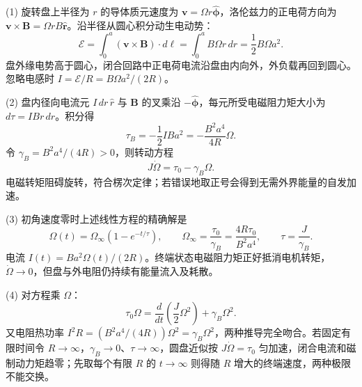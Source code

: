 (1) 旋转盘上半径为 \(r\) 的导体质元速度为 \(\boldsymbol v=\Omega r\hat{\boldsymbol\phi}\)，洛伦兹力的正电荷方向为 \(\boldsymbol v\times\boldsymbol B=\Omega rB\hat{\boldsymbol r}\)。沿半径从圆心积分动生电动势：
\[
\mathcal E=\int_0^a(\boldsymbol v\times\boldsymbol B)\cdot d\boldsymbol\ell
=\int_0^a B\Omega r\,dr=\frac12B\Omega a^2.
\]
盘外缘电势高于圆心，闭合回路中正电荷电流沿盘由内向外，外负载再回到圆心。忽略电感时 \(I=\mathcal E/R=B\Omega a^2/(2R)\)。

(2) 盘内径向电流元 \(I\,dr\,\hat r\) 与 \(\boldsymbol B\) 的叉乘沿 \(-\hat{\boldsymbol\phi}\)，每元所受电磁阻力矩大小为 \(d\tau=IBr\,dr\)。积分得
\[
\tau_B=-\frac12IBa^2=-\frac{B^2a^4}{4R}\Omega .
\]
令 \(\gamma_B=B^2a^4/(4R)>0\)，则转动方程
\[
J\dot\Omega=\tau_0-\gamma_B\Omega .
\]
电磁转矩阻碍旋转，符合楞次定律；若错误地取正号会得到无需外界能量的自发加速。

(3) 初角速度零时上述线性方程的精确解是
\[
\Omega(t)=\Omega_\infty(1-e^{-t/\tau}),\qquad
\Omega_\infty=\frac{\tau_0}{\gamma_B}=\frac{4R\tau_0}{B^2a^4},
\qquad\tau=\frac J{\gamma_B}.
\]
电流 \(I(t)=Ba^2\Omega(t)/(2R)\)。终端状态电磁阻力矩正好抵消电机转矩，\(\dot\Omega\to0\)，但盘与外电阻仍持续有能量流入及耗散。

(4) 对方程乘 \(\Omega\)：
\[
\tau_0\Omega=\frac{d}{dt}\left(\frac J2\Omega^2\right)+\gamma_B\Omega^2.
\]
又电阻热功率 \(I^2R=(B^2a^4/(4R))\Omega^2=\gamma_B\Omega^2\)，两种推导完全吻合。若固定有限时间令 \(R\to\infty\)，\(\gamma_B\to0\)、\(\tau\to\infty\)，圆盘近似按 \(J\dot\Omega=\tau_0\) 匀加速，闭合电流和磁制动力矩趋零；先取每个有限 \(R\) 的 \(t\to\infty\) 则得随 \(R\) 增大的终端速度，两种极限不能交换。
